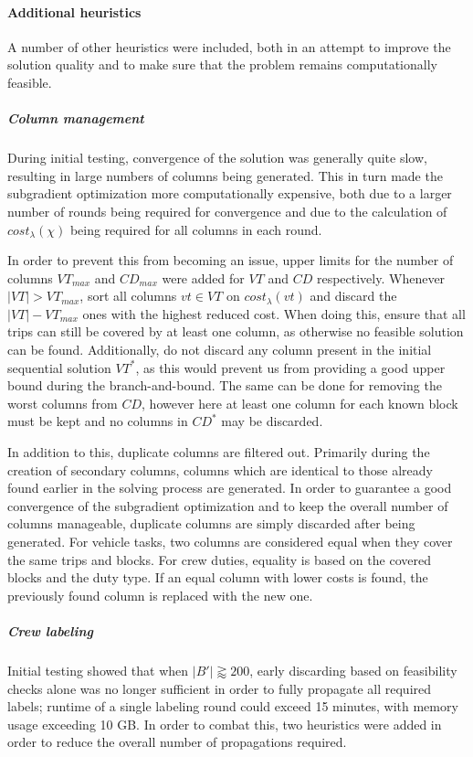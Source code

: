 \documentclass[]{article}
\begin{document}
\paragraph{Additional heuristics}
A number of other heuristics were included, both in an attempt to improve the solution quality and to make sure that the problem remains computationally feasible.

\subparagraph{Column management} During initial testing, convergence of the solution was generally quite slow, resulting in large numbers of columns being generated. This in turn made the subgradient optimization more computationally expensive, both due to a larger number of rounds being required for convergence and due to the calculation of $cost_\lambda(\chi)$ being required for all columns in each round. 

In order to prevent this from becoming an issue, upper limits for the number of columns $VT_{max}$ and $CD_{max}$ were added for $VT$ and $CD$ respectively. Whenever $|VT| > VT_{max}$, sort all columns $vt \in VT$ on $cost_\lambda(vt)$ and discard the $|VT| - VT_{max}$ ones with the highest reduced cost. When doing this, ensure that all trips can still be covered by at least one column, as otherwise no feasible solution can be found. Additionally, do not discard any column present in the initial sequential solution $VT^*$, as this would prevent us from providing a good upper bound during the branch-and-bound. The same can be done for removing the worst columns from $CD$, however here at least one column for each known block must be kept and no columns in $CD^*$ may be discarded.

In addition to this, duplicate columns are filtered out. Primarily during the creation of secondary columns, columns which are identical to those already found earlier in the solving process are generated. In order to guarantee a good convergence of the subgradient optimization and to keep the overall number of columns manageable, duplicate columns are simply discarded after being generated. For vehicle tasks, two columns are considered equal when they cover the same trips and blocks. For crew duties, equality is based on the covered blocks and the duty type. If an equal column with lower costs is found, the previously found column is replaced with the new one.

\subparagraph{Crew labeling} Initial testing showed that when $|B'| \gtrapprox 200$, early discarding based on feasibility checks alone was no longer sufficient in order to fully propagate all required labels; runtime of a single labeling round could exceed 15 minutes, with memory usage exceeding 10 GB. In order to combat this, two heuristics were added in order to reduce the overall number of propagations required.
\end{document}
